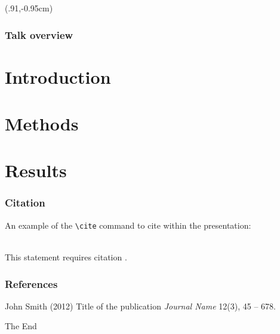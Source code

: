 \documentclass{beamer}
\begin{document}
\begin{frame}%

\titlepage
\begin{textblock*}{100mm}(.91\textwidth,-0.95cm)
\end{textblock*}
\end{frame}



\begin{frame}
\frametitle{Talk overview}
\tableofcontents 
\end{frame}


\section{Introduction}


\section{Methods}



\section{Results}

\begin{frame}[fragile]
\frametitle{Citation}
An example of the \verb|\cite| command to cite within the presentation:\\~

This statement requires citation \cite{p1}.
\end{frame}

\begin{frame}
\frametitle{References}
\footnotesize{
\begin{thebibliography}{99} 
 John Smith (2012)
\newblock Title of the publication
\newblock \emph{Journal Name} 12(3), 45 -- 678.
\end{thebibliography}
}
\end{frame}


\begin{frame}
\Huge{\centerline{The End}}
\end{frame}

\end{document}
